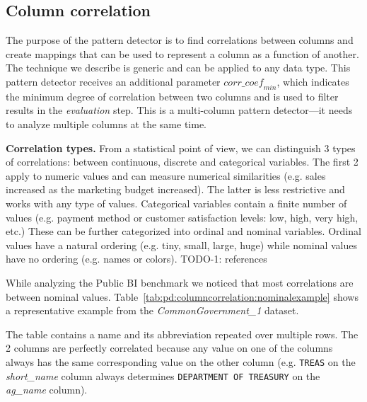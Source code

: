 \subsection{Column correlation}
\label{subsec:pd:columncorrelation}



\graphicspath{{5_automatic_learning/pattern_detection/images/}}

% 

The purpose of the  pattern detector is to find correlations between columns and create mappings that can be used to represent a column as a function of another. The technique we describe is generic and can be applied to any data type. This pattern detector receives an additional parameter \(\mathit{corr\_coef}_{min}\), which indicates the minimum degree of correlation between two columns and is used to filter results in the \textit{evaluation} step. This is a multi-column pattern detector---it needs to analyze multiple columns at the same time.

\textbf{Correlation types.} From a statistical point of view, we can distinguish 3 types of correlations: between continuous, discrete and categorical variables. The first 2 apply to numeric values and can measure numerical similarities (e.g. sales increased as the marketing budget increased). The latter is less restrictive and works with any type of values. Categorical variables contain a finite number of values (e.g. payment method or customer satisfaction levels: low, high, very high, etc.) 
These can be further categorized into ordinal and nominal variables. Ordinal values have a natural ordering (e.g. tiny, small, large, huge) while nominal values have no ordering (e.g. names or colors).
TODO-1: references

While analyzing the Public BI benchmark we noticed that most correlations are between nominal values. Table~\ref{tab:pd:columncorrelation:nominalexample} shows a representative example from the \textit{CommonGovernment\_1} dataset.



The table contains a name and its abbreviation repeated over multiple rows. The 2 columns are perfectly correlated because any value on one of the columns always has the same corresponding value on the other column (e.g. \verb|TREAS| on the \textit{short\_name} column always determines \verb|DEPARTMENT OF TREASURY| on the \textit{ag\_name} column).

